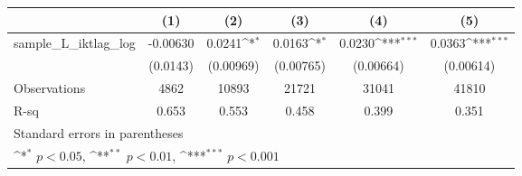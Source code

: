 {
\def\sym#1{\ifmmode^{#1}\else\(^{#1}\)\fi}
\begin{tabular}{l*{5}{c}}
\hline\hline
                &\multicolumn{1}{c}{(1)}         &\multicolumn{1}{c}{(2)}         &\multicolumn{1}{c}{(3)}         &\multicolumn{1}{c}{(4)}         &\multicolumn{1}{c}{(5)}         \\
\hline
sample\_L\_iktlag\_log& -0.00630         &   0.0241\sym{*}  &   0.0163\sym{*}  &   0.0230\sym{***}&   0.0363\sym{***}\\
                & (0.0143)         &(0.00969)         &(0.00765)         &(0.00664)         &(0.00614)         \\
\hline
Observations    &     4862         &    10893         &    21721         &    31041         &    41810         \\
R-sq            &    0.653         &    0.553         &    0.458         &    0.399         &    0.351         \\
\hline\hline
\multicolumn{6}{l}{\footnotesize Standard errors in parentheses}\\
\multicolumn{6}{l}{\footnotesize \sym{*} \(p<0.05\), \sym{**} \(p<0.01\), \sym{***} \(p<0.001\)}\\
\end{tabular}
}
